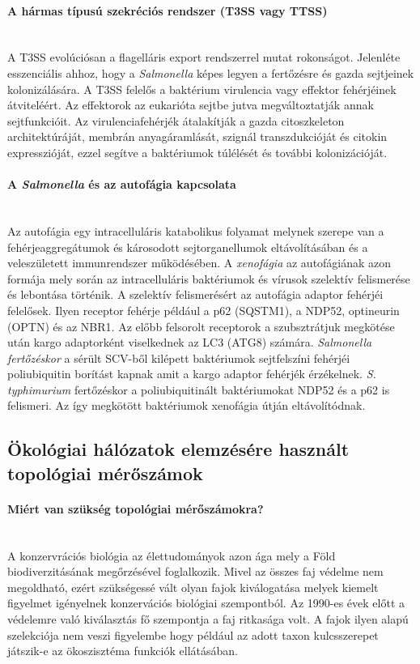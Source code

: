 \documentclass[a4paper,12pt]{article}
\begin{document}
		 \paragraph{A hármas típusú szekréciós rendszer (T3SS vagy TTSS)} \mbox{}\\
		 A T3SS evolúciósan a flagelláris export rendszerrel mutat rokonságot. Jelenléte esszenciális ahhoz, hogy a \textit{Salmonella} képes legyen a fertőzésre és gazda sejtjeinek kolonizálására. A T3SS felelős a baktérium virulencia vagy effektor fehérjéinek átviteléért. Az effektorok az eukarióta sejtbe jutva megváltoztatják annak sejtfunkcióit. Az virulenciafehérjék átalakítják a gazda citoszkeleton architektúráját, membrán anyagáramlását, szignál transzdukcióját és citokin expresszióját, ezzel segítve a baktériumok túlélését és további kolonizációját. \cite{salmonella_and_host_cell_nature}
		 
		 \paragraph{A \textit{Salmonella} és az autofágia kapcsolata} \mbox{}\\
		 Az autofágia egy intracelluláris katabolikus folyamat melynek szerepe van a fehérjeaggregátumok és károsodott sejtorganellumok eltávolításában és a veleszületett immunrendszer működésében. A \textit{xenofágia} az autofágiának azon formája mely során az intracelluláris baktériumok és vírusok szelektív felismerése és lebontása történik. A szelektív felismerésért az autofágia adaptor fehérjéi felelősek. Ilyen receptor fehérje például a p62 (SQSTM1), a NDP52, optineurin (OPTN) és az NBR1. Az előbb felsorolt receptorok a szubsztrátjuk megkötése után kargo adaptorként viselkednek az LC3 (ATG8) számára. \textit{Salmonella fertőzéskor} a sérült SCV-ből kilépett baktériumok sejtfelszíni fehérjéi poliubiquitin borítást kapnak amit a kargo adaptor fehérjék érzékelnek. \textit{S. typhimurium} fertőzéskor a poliubiquitinált baktériumokat NDP52 és a p62 is felismeri. Az így megkötött baktériumok xenofágia útján eltávolítódnak. \cite{salmonella_authopagy_intro}
	
	\subsection{Ökológiai hálózatok elemzésére használt topológiai mérőszámok}
	 
	 \paragraph{Miért van szükség topológiai mérőszámokra?} \mbox{}\\ %
	 A konzervrációs biológia az élettudományok azon ága mely a Föld biodiverzitásának megőrzésével foglalkozik. Mivel az összes faj védelme nem megoldható, ezért szükségessé vált olyan fajok kiválogatása melyek kiemelt figyelmet igényelnek konzervációs biológiai szempontból.\cite{new_zeland} Az 1990-es évek előtt a védelemre való kiválasztás fő szempontja a faj ritkasága volt.  A fajok ilyen alapú szelekciója nem veszi figyelembe hogy például az adott taxon kulcsszerepet játszik-e az ökoszisztéma funkciók ellátásában. \cite{jordan_comparison}
	 
\end{document}

